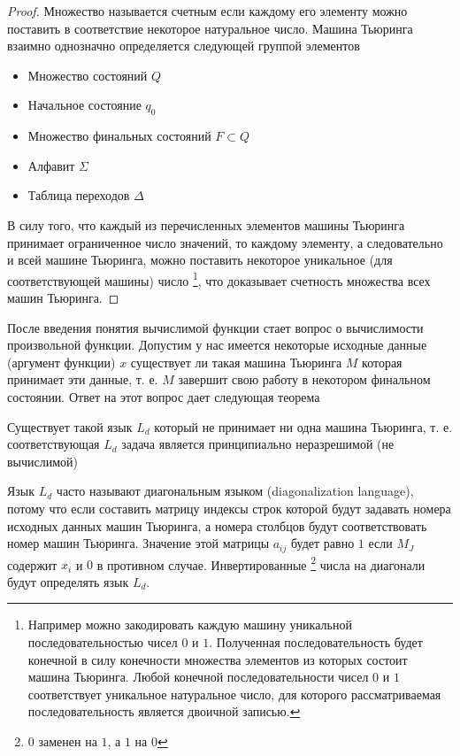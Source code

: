 \begin{proof}
Множество называется счетным \cite{bShenSet2012} если каждому его
элементу можно поставить 
в соответствие некоторое натуральное число. 
Машина Тьюринга взаимно однозначно определяется следующей группой элементов
\begin{itemize}
\item Множество состояний $Q$
\item Начальное состояние $q_0$
\item Множество финальных состояний $F \subset Q$
\item Алфавит $\Sigma$
\item Таблица переходов $\Delta$
\end{itemize}

В силу того, что каждый из перечисленных элементов машины Тьюринга
принимает ограниченное число значений, то каждому элементу, а
следовательно и всей машине Тьюринга, можно поставить некоторое
уникальное (для соответствующей машины) число
\footnote{
Например можно закодировать каждую машину уникальной
последовательностью чисел $0$ и $1$. Полученная последовательность
будет конечной в силу конечности множества элементов из которых
состоит машина Тьюринга. Любой конечной последовательности чисел $0$ и
$1$ соответствует уникальное натуральное число, для которого
рассматриваемая последовательность является двоичной записью. 
}, что доказывает счетность
множества всех машин Тьюринга.
\end{proof}

После введения понятия вычислимой функции стает вопрос о вычислимости
произвольной функции. Допустим у нас имеется некоторые исходные данные
(аргумент функции) $x$ существует ли такая машина Тьюринга $M$ которая
принимает эти данные, т. е. $M$ завершит свою работу в некотором
финальном состоянии. Ответ на этот вопрос дает следующая теорема

\begin{theorem}[О невычислимости]
Существует такой язык $L_d$ который не принимает ни одна машина
Тьюринга, т. е. соответствующая $L_d$ задача является принципиально
неразрешимой (не вычислимой) 
\label{theoremAddAlgoTuringLdUndecidability}
\end{theorem}

Язык $L_d$ часто называют диагональным языком (diagonalization
language), потому что если составить матрицу 
\cite{bUllman2006} индексы строк которой
будут задавать номера исходных данных машин Тьюринга, а номера
столбцов будут соответствовать номер машин Тьюринга. Значение этой
матрицы $a_{ij}$ будет равно $1$ если $M_J$ содержит $x_i$ и $0$ в
противном случае. Инвертированные \footnote{ $0$ заменен на $1$, а $1$
на $0$} числа на диагонали будут определять язык $L_d$.

